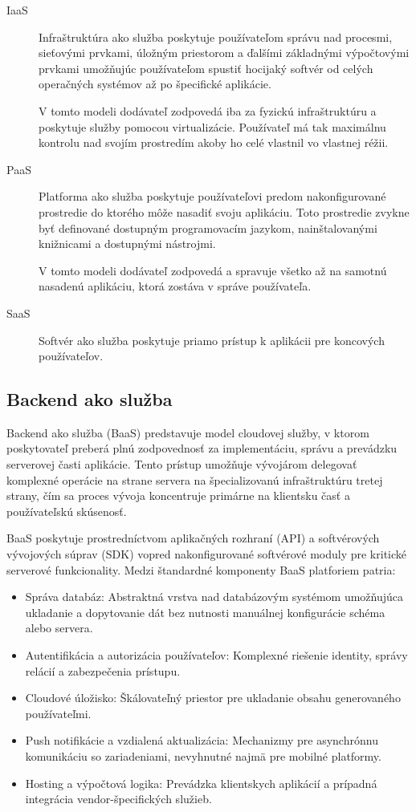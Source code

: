 \begin{description}
    \item[IaaS] Infraštruktúra ako služba poskytuje používateľom správu nad procesmi, sieťovými prvkami, úložným priestorom a ďalšími základnými výpočtovými prvkami umožňujúc používateľom spustiť hocijaký softvér od celých operačných systémov až po špecifické aplikácie. 
    
    V tomto modeli dodávateľ zodpovedá iba za fyzickú infraštruktúru a poskytuje služby pomocou virtualizácie.
    Používateľ má tak maximálnu kontrolu nad svojím prostredím akoby ho celé vlastnil vo vlastnej réžii.
    
    \item[PaaS] Platforma ako služba poskytuje používateľovi predom nakonfigurované prostredie do ktorého môže nasadiť svoju aplikáciu. Toto prostredie zvykne byť definované dostupným programovacím jazykom, nainštalovanými knižnicami a dostupnými nástrojmi. 
    
    V tomto modeli dodávateľ zodpovedá a spravuje všetko až na samotnú nasadenú aplikáciu, ktorá zostáva v správe používateľa. 
    
    \item[SaaS] Softvér ako služba poskytuje priamo prístup k aplikácii pre koncových používateľov.
\end{description}


\subsection{Backend ako služba}
Backend ako služba (BaaS) predstavuje model cloudovej služby, v ktorom poskytovateľ preberá plnú zodpovednosť za implementáciu, správu a prevádzku serverovej časti aplikácie. Tento prístup umožňuje vývojárom delegovať komplexné operácie na strane servera na špecializovanú infraštruktúru tretej strany, čím sa proces vývoja koncentruje primárne na klientsku časť a používateľskú skúsenosť.

BaaS poskytuje prostredníctvom aplikačných rozhraní (API) a softvérových vývojových súprav (SDK) vopred nakonfigurované softvérové moduly pre kritické serverové funkcionality. Medzi štandardné komponenty BaaS platforiem patria:
\begin{itemize}
    \item Správa databáz: Abstraktná vrstva nad databázovým systémom umožňujúca ukladanie a dopytovanie dát bez nutnosti manuálnej konfigurácie schéma alebo servera.
    \item Autentifikácia a autorizácia používateľov: Komplexné riešenie identity, správy relácií a zabezpečenia prístupu.
    \item Cloudové úložisko: Škálovateľný priestor pre ukladanie obsahu generovaného používateľmi.
    \item Push notifikácie a vzdialená aktualizácia: Mechanizmy pre asynchrónnu komunikáciu so zariadeniami, nevyhnutné najmä pre mobilné platformy.
    \item Hosting a výpočtová logika: Prevádzka klientskych aplikácií a prípadná integrácia vendor-špecifických služieb.
\end{itemize}
\cite{baas}

